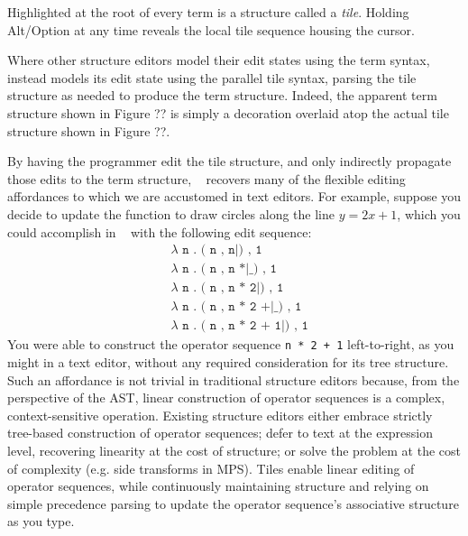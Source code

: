 Highlighted at the root of every term is a structure called
a \emph{tile}.
Holding Alt/Option at any time reveals the local tile sequence
housing the cursor.


Where other structure editors model their edit states
using the term syntax, \tylr~ instead models its edit state
using the parallel tile syntax, parsing the tile structure
as needed to produce the term structure.
Indeed, the apparent term structure shown in Figure ?? is simply a
decoration overlaid atop the actual tile structure shown in
Figure ??.

By having the programmer edit the tile structure, and only
indirectly propagate those edits to the term structure,
\tylr~ recovers many of the flexible editing affordances to
which we are accustomed in text editors.
For example, suppose you decide to update the function to
draw circles along the line $y = 2x + 1$, which you
could accomplish in \tylr~ with the following edit sequence:
\begin{align*}
  & \texttt{$\lambda$ n . ( n , n|) , 1} \\
  & \texttt{$\lambda$ n . ( n , n *|\_ ) , 1} \\
  & \texttt{$\lambda$ n . ( n , n * 2|) , 1} \\
  & \texttt{$\lambda$ n . ( n , n * 2 +|\_ ) , 1} \\
  & \texttt{$\lambda$ n . ( n , n * 2 + 1|) , 1}
\end{align*}
You were able to construct the operator sequence \texttt{n * 2 + 1}
left-to-right, as you might in a text editor, without any
required consideration for its tree structure.
Such an affordance is not trivial
in traditional structure editors because,
from the perspective of the AST, linear construction of
operator sequences is a complex, context-sensitive operation.
Existing structure editors either embrace strictly tree-based
construction of operator sequences;
defer to text at the expression level,
recovering linearity at the cost of structure;
or solve the problem at the cost of complexity
(e.g. side transforms in MPS).
Tiles enable linear editing of operator sequences,
while continuously maintaining structure and
relying on simple precedence parsing
to update the operator sequence's associative structure
as you type.


